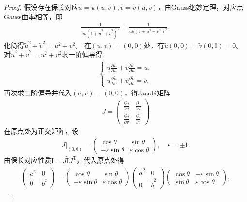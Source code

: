 \documentclass[../../main.tex]{subfiles}%
\begin{document}
\begin{proof}
假设存在保长对应$\tilde{u}=\tilde{u}(u,v),\tilde{v}=\tilde{v}(u,v)$，由Gauss绝妙定理，对应点Gauss曲率相等，即
\begin{align*}
\frac{1}{ab(1+\tilde{u}^2+\tilde{v}^2)^2}=\frac{1}{ab(1+u^2+v^2)^2},
\end{align*}
化简得$\tilde{u}^2+\tilde{v}^2=u^2+v^2$。
在$(u,v)=(0,0)$处，有$\tilde{u}(0,0)=\tilde{v}(0,0)=0$。对$\tilde{u}^2+\tilde{v}^2=u^2+v^2$求一阶偏导得
\begin{align*}
\begin{cases}
\tilde{u}\frac{\partial\tilde{u}}{\partial u}+\tilde{v}\frac{\partial\tilde{v}}{\partial u}=u,\\
\tilde{u}\frac{\partial\tilde{u}}{\partial v}+\tilde{v}\frac{\partial\tilde{v}}{\partial v}=v.
\end{cases}
\end{align*}
再次求二阶偏导并代入$(u,v)=(0,0)$，得Jacobi矩阵
\begin{align*}
J=\begin{pmatrix}
\frac{\partial\tilde{u}}{\partial u}&\frac{\partial\tilde{v}}{\partial u}\\
\frac{\partial\tilde{u}}{\partial v}&\frac{\partial\tilde{v}}{\partial v}
\end{pmatrix}
\end{align*}
在原点处为正交矩阵，设
\begin{align*}
J|_{(0,0)}=\begin{pmatrix}
\cos\theta&\sin\theta\\
-\varepsilon\sin\theta&\varepsilon\cos\theta
\end{pmatrix},\quad \varepsilon=\pm1.
\end{align*}
由保长对应性质$\mathrm{I}=J\tilde{\mathrm{I}}J^\mathrm{T}$，代入原点处得
\begin{align*}
\begin{pmatrix}a^2&0\\0&b^2\end{pmatrix}=
\begin{pmatrix}\cos\theta&\sin\theta\\-\varepsilon\sin\theta&\varepsilon\cos\theta\end{pmatrix}
\begin{pmatrix}\tilde{a}^2&0\\0&\tilde{b}^2\end{pmatrix}
\begin{pmatrix}\cos\theta&-\varepsilon\sin\theta\\\sin\theta&\varepsilon\cos\theta\end{pmatrix},

\end{align*}
\end{proof}
\end{document}
